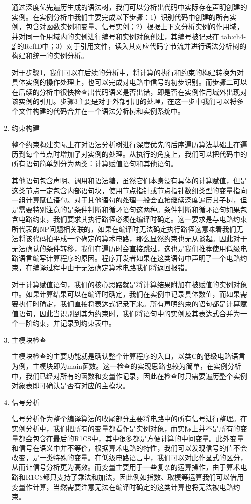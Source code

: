 \begin{enumerate}
    通过深度优先遍历生成的语法树，我们可以分析出代码中实际存在声明创建的实例。在实例分析中我们主要完成以下步骤：1）识别代码中创建的所有实例，包含对函数实例和变量、信号实例；2）根据上下文分析实例的作用域，并对同一作用域内的实例进行编号和实例对象创建，其编号被记录在\autoref{tab:ch4-2}的RefID中；3）对于引用文件，读入其对应代码字节流并进行语法分析树的构建和统一的实例分析。
    
    对于步骤1，我们可以在后续的分析中，将计算的执行和约束的构建转换为对具体实例的操作处理上，也可以完成对电路中信号的初步识别。而步骤二可以在后续的分析中很快检查出代码语义是否出错，即是否在实例作用域外出现对该实例的引用。步骤3主要是对于外部引用的处理，在这一步中我们可以将多个文件构建的代码合并在一个语法分析树和实例系统中。
    \item 约束构建
    
    整个约束构建实际上在对语法分析树进行深度优先的后序遍历算法基础上在遍历到每个节点时增加了对实例的处理。从执行的角度上，我们可以把代码中的所有语句简单划分为两类：计算赋值语句和其他语句。
    
    其他语句包含声明、调用和语法糖，虽然它们本身没有具体的计算赋值，但是这类节点一定包含内部语句块，使用节点指针或节点指针数组类型的变量指向一组计算赋值语句。对于其他语句的处理一般会直接继续深度遍历其子树，但是需要特别注意的是条件判断和循环语句这两种。条件判断和循环语句如果包含电路约束，我们要求其执行路径必须在编译时确定。这一要求是与电路约束所代表的NP问题相关联的，如果在编译时无法确定执行路径这意味着我们无法将该代码拍平成一个确定的算术电路，那么显然约束也无从谈起。因此对于无法确认的条件转移，我们在遍历时会直接跳过，这也是我们推荐使用低级电路语言编写计算程序的原因。程序开发者如果在这类语句中声明了一个电路约束，在编译过程中由于无法确定算术电路我们将返回报错。

    对于计算赋值语句，我们的核心思路就是将计算结果附加在被赋值的实例对象中。如果计算结果可以在编译时确定，我们在实例中记录具体数值，而如果需要执行时确定，我们直接将表达式记录下来。所有声明约束的语句都是计算赋值语句，因此当识别到其为约束时，我们将语句中的实例及其表达式合并为一个一阶约束，并记录到约束表中。
    \item 主模块检查
    
    主模块检查的主要功能就是确认整个计算程序的入口，以类C的低级电路语言为例，主模块即为main函数。这一检查的实现思路也较为简单，在实例分析中，我们已经对所有的函数和变量作记录，因此在检查时只需要遍历整个实例对象表即可确认是否有对应的主模块。
    \item 信号分析
    
    信号分析作为整个编译算法的收尾部分主要将电路中的所有信号进行整理。在实例分析中，我们把所有的变量都看作是实例对象，而实际上并不是所有的变量都会包含在最后的R1CS中，其中很多都是方便计算的中间变量。此外变量和信号在语义中并不等价，根据算术电路的特性，我们可以发现信号的值不会改变，是一类特殊的变量。在低级电路语言中，我们可以对此作显式的区分，从而让信号分析更为高效。而变量主要用于一些复杂的运算操作，由于算术电路和R1CS都只支持了乘法和加法，因此例如指数、取模等运算我们可以借用变量作计算，当然需要注意无法在编译时确定的这类计算也将无法被电路约束。


\end{enumerate}
